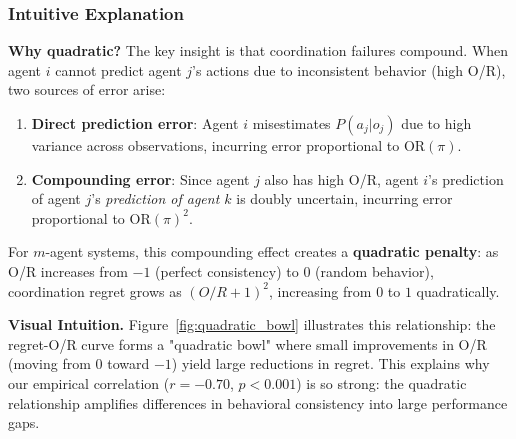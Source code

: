 \subsubsection{Intuitive Explanation}

\textbf{Why quadratic?} The key insight is that coordination failures compound. When agent $i$ cannot predict agent $j$'s actions due to inconsistent behavior (high O/R), two sources of error arise:

\begin{enumerate}
    \item \textbf{Direct prediction error}: Agent $i$ misestimates $P(a_j|o_j)$ due to high variance across observations, incurring error proportional to $\text{OR}(\pi)$.
    \item \textbf{Compounding error}: Since agent $j$ also has high O/R, agent $i$'s prediction of agent $j$'s \textit{prediction of agent $k$} is doubly uncertain, incurring error proportional to $\text{OR}(\pi)^2$.
\end{enumerate}

For $m$-agent systems, this compounding effect creates a \textbf{quadratic penalty}: as O/R increases from $-1$ (perfect consistency) to $0$ (random behavior), coordination regret grows as $(O/R + 1)^2$, increasing from $0$ to $1$ quadratically.

\textbf{Visual Intuition.} Figure~\ref{fig:quadratic_bowl} illustrates this relationship: the regret-O/R curve forms a "quadratic bowl" where small improvements in O/R (moving from $0$ toward $-1$) yield large reductions in regret. This explains why our empirical correlation ($r = -0.70$, $p < 0.001$) is so strong: the quadratic relationship amplifies differences in behavioral consistency into large performance gaps.

